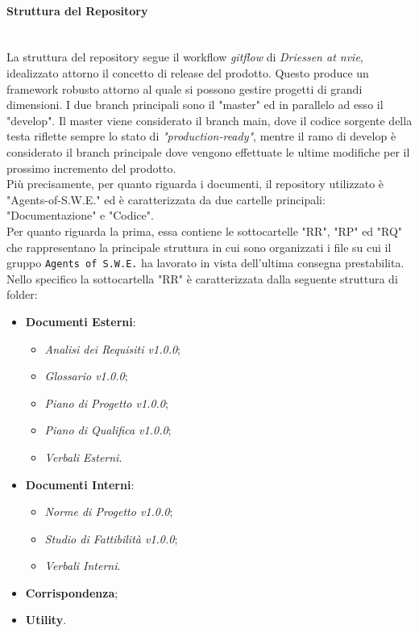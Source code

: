 \paragraph{Struttura del Repository} \-\\
La struttura del repository segue il workflow \textit{gitflow} di \textit{Driessen at nvie}, idealizzato attorno il concetto di release del prodotto. Questo produce un framework robusto attorno al quale si possono gestire progetti di grandi dimensioni. I due branch principali sono il "master" ed in parallelo ad esso il "develop".
Il master viene considerato il branch main, dove il codice sorgente della testa riflette sempre lo stato di \textit{"production-ready"},
mentre il ramo di develop è considerato il branch principale dove vengono effettuate le ultime modifiche per il prossimo incremento del prodotto.\\
Più precisamente, per quanto riguarda i documenti, il repository utilizzato è "Agents-of-S.W.E." ed è caratterizzata da due cartelle principali: "Documentazione" e "Codice".\\
Per quanto riguarda la prima, essa contiene le sottocartelle "RR", "RP" ed "RQ" che rappresentano la principale struttura in cui sono organizzati i file su cui il gruppo \texttt{Agents of S.W.E.} ha lavorato in vista dell'ultima consegna prestabilita.\\
	Nello specifico la sottocartella "RR" è caratterizzata dalla seguente struttura di folder:
	\begin{itemize}
	\item \textbf{Documenti Esterni}:
		\begin{itemize}
		\item \textit{Analisi dei Requisiti v1.0.0};
		\item \textit{Glossario v1.0.0};
		\item \textit{Piano di Progetto v1.0.0};
		\item \textit{Piano di Qualifica v1.0.0};
		\item \textit{Verbali Esterni}.
		\end{itemize}
	\item \textbf{Documenti Interni}:
		\begin{itemize}
		\item \textit{Norme di Progetto v1.0.0};
		\item \textit{Studio di Fattibilità v1.0.0};
		\item \textit{Verbali Interni}.
		\end{itemize}
	\item \textbf{Corrispondenza};
	\item \textbf{Utility}.
	\end{itemize}
